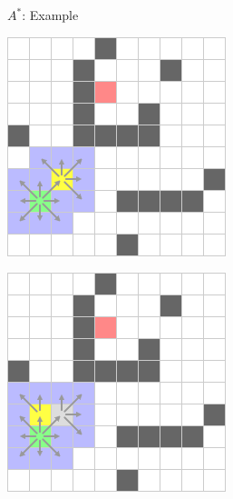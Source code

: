 \documentclass{presentation}
\begin{document}
\begin{frame}{$A^*$: Example}
	\begin{minipage}{0.23\textwidth}
		\includegraphics[width=\textwidth]{figures/A-Stern_geschnitten(241x241)/3.png}
	\end{minipage}%
	\hfill%
	\begin{minipage}{0.23\textwidth}
		\includegraphics[width=\textwidth]{figures/A-Stern_geschnitten(241x241)/4.png}

\end{minipage}
\end{frame}
\end{document}
